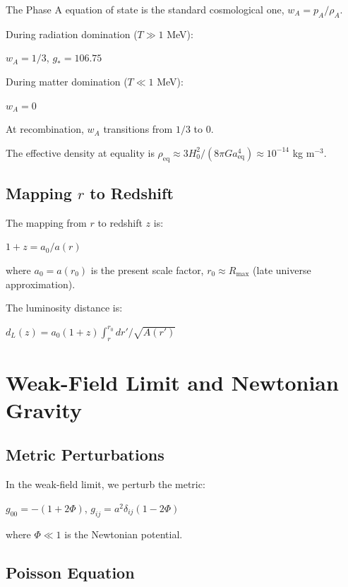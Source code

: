 \documentclass[10pt,twocolumn]{article}
\theoremstyle{definition}
\newcommand{\Rmax}{R_{\max}}
\newcommand{\rhoA}{\rho_{A}}
\begin{document}
The Phase A equation of state is the standard cosmological one, \( w_{A} = p_{A} / \rhoA \).

During radiation domination (\( T \gg 1 \) MeV):

\( w_{A} = 1/3 \), \( g_{*} = 106.75 \)

During matter domination (\( T \ll 1 \) MeV):

\( w_{A} = 0 \)

At recombination, \( w_{A} \) transitions from $1/3$ to $0$.

The effective density at equality is \( \rho_{\mathrm{eq}} \approx 3 H_{0}^{2} / (8 \pi G a_{\mathrm{eq}}^{4}) \approx 10^{-14} \) kg m\( ^{-3} \).

\subsection{Mapping \( r \) to Redshift}

The mapping from \( r \) to redshift \( z \) is:

$1 + z = a_{0} / a(r)$

where \( a_{0} = a(r_{0}) \) is the present scale factor, \( r_{0} \approx \Rmax \) (late universe approximation).

The luminosity distance is:

\( d_{L}(z) = a_{0} (1 + z) \int_{r}^{r_{0}} dr' / \sqrt{A(r')} \)

\section{Weak-Field Limit and Newtonian Gravity}
\label{sec:newtonian}

\subsection{Metric Perturbations}

In the weak-field limit, we perturb the metric:

\( g_{00} = - (1 + 2 \Phi) \), \( g_{ij} = a^{2} \delta_{ij} (1 - 2 \Phi) \)

where \( \Phi \ll 1 \) is the Newtonian potential.

\subsection{Poisson Equation}
\end{document}
